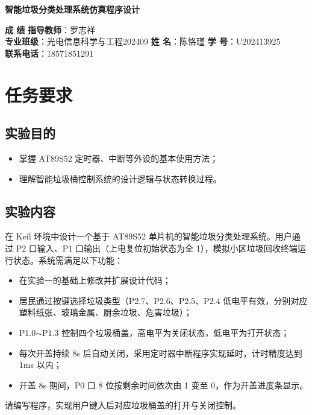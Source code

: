 \documentclass[12pt,a4paper]{article}
\begin{document}
\begin{center}
    \textbf{\small 智能垃圾分类处理系统仿真程序设计}
\end{center}

\noindent
\textbf{成  绩}\hspace{4cm} \textbf{指导教师}：罗志祥 \\
\textbf{专业班级}：光电信息科学与工程202409 \hspace{1cm} \textbf{姓  名}：陈恪瑾 \hspace{1cm} \textbf{学  号}：U202413925 \\
\textbf{联系电话}：18571851291

\section{任务要求}
\subsection{实验目的}
\begin{itemize}
    \item 掌握 AT89S52 定时器、中断等外设的基本使用方法；
    \item 理解智能垃圾桶控制系统的设计逻辑与状态转换过程。
\end{itemize}

\subsection{实验内容}
在 Keil 环境中设计一个基于 AT89S52 单片机的智能垃圾分类处理系统。用户通过 P2 口输入、P1 口输出（上电复位初始状态为全 1），模拟小区垃圾回收终端运行状态。系统需满足以下功能：
\begin{itemize}
    \item 在实验一的基础上修改并扩展设计代码；
    \item 居民通过按键选择垃圾类型（P2.7、P2.6、P2.5、P2.4 低电平有效，分别对应塑料纸张、玻璃金属、厨余垃圾、危害垃圾）；
    \item P1.0$\sim$P1.3 控制四个垃圾桶盖，高电平为关闭状态，低电平为打开状态；
    \item 每次开盖持续 8s 后自动关闭，采用定时器中断程序实现延时，计时精度达到 1ms 以内；
    \item 开盖 8s 期间，P0 口 8 位按剩余时间依次由 1 变至 0，作为开盖进度条显示。
\end{itemize}
请编写程序，实现用户键入后对应垃圾桶盖的打开与关闭控制。
\end{document}
